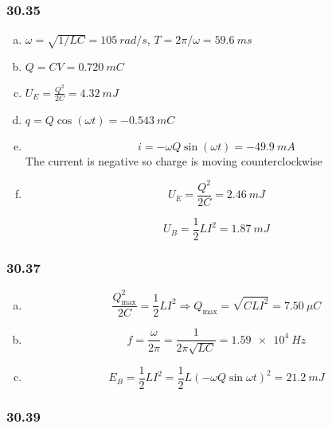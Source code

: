 \documentclass{article}
\begin{document}
\subsubsection{30.35}

\begin{enumerate}[(a)]
  \item $\omega = \sqrt{1 / L C} = \qty{105}{rad/s}$, $T = 2 \pi / \omega = \qty{59.6}{ms}$

  \item $Q = C V = \qty{0.720}{mC}$

  \item $U_E = \frac{Q^2}{2 C} = \qty{4.32}{mJ}$

  \item $q = Q \cos (\omega t) = \qty{-0.543}{mC}$

  \item \[i = -\omega Q \sin (\omega t) = \qty{-49.9}{mA}\] The current is negative so charge is moving counterclockwise

  \item

        \[U_E = \frac{Q^2}{2 C} = \qty{2.46}{mJ}\]

        \[U_B = \frac{1}{2} L I^2 = \qty{1.87}{mJ}\]
\end{enumerate}

\subsubsection{30.37}

\begin{enumerate}[(a)]
  \item \[\frac{Q_\text{max}^2}{2 C} = \frac{1}{2} L I^2 \Rightarrow Q_\text{max} = \sqrt{C L I^2} = \qty{7.50}{\mu C}\]

  \item \[f = \frac{\omega}{2 \pi} = \frac{1}{2 \pi \sqrt{L C}} = \qty{1.59e4}{Hz}\]

  \item \[E_B = \frac{1}{2} L I^2 = \frac{1}{2} L (-\omega Q \sin \omega t)^2 = \qty{21.2}{mJ}\]
\end{enumerate}

\subsubsection{30.39}
\end{document}
